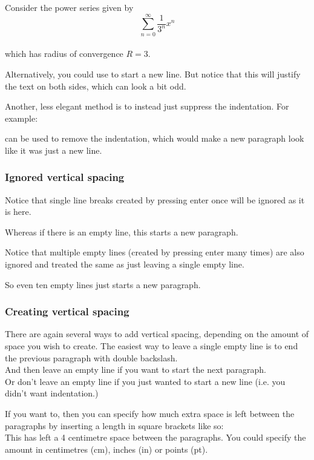 \documentclass[a4paper,11pt]{article}
\begin{document}
Consider the power series given by \[\sum_{n=0}^\infty \frac{1}{3^n} x^n\]\\
which has radius of convergence $R=3$.

Alternatively, you could use \linebreak to start a new line. But notice that this will justify the text on both sides, which can look a bit odd.

Another, less elegant method is to instead just suppress the indentation. For example:

\noindent can  be used  to remove the indentation, which would make a new paragraph look like it was just a new line.

\subsubsection{Ignored vertical spacing}

Notice
that
single
line
breaks
created
by
pressing
enter
once
will
be
ignored
as
it
is
here.

Whereas if there is an empty line, this starts a new paragraph.


Notice that multiple empty lines (created by pressing enter many times) are also ignored and treated the same as just leaving a single empty line.










So even ten empty lines just starts a new paragraph.



\subsubsection{Creating vertical spacing}

There are again several ways to add  vertical spacing, depending on the amount of space you wish to create. The easiest way to leave a single empty line is to end the previous paragraph with double backslash. \\

And then leave an empty line if you want to start the next paragraph.\\
Or don't leave an empty line if you just wanted to start a new line (i.e. you didn't want indentation.)

If you want to, then you can specify how much extra space is left between the paragraphs by inserting a length in square brackets like so:\\[4cm]
This has left a 4 centimetre space between the paragraphs. You could specify the amount in centimetres (cm), inches (in) or points (pt).
\end{document}
